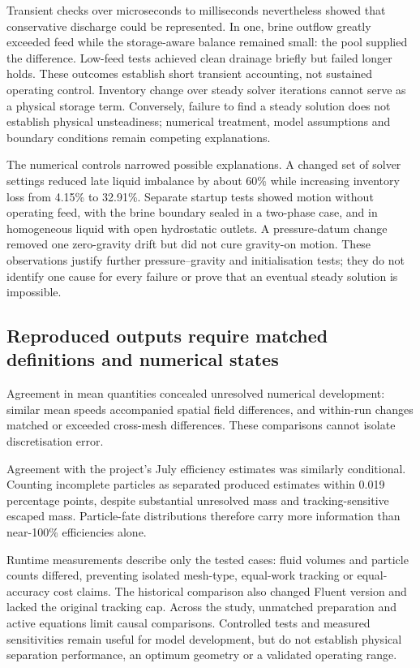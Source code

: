 Transient checks over microseconds to milliseconds nevertheless showed that conservative discharge could be represented. In one, brine outflow greatly exceeded feed while the storage-aware balance remained small: the pool supplied the difference. Low-feed tests achieved clean drainage briefly but failed longer holds. These outcomes establish short transient accounting, not sustained operating control. Inventory change over steady solver iterations cannot serve as a physical storage term. Conversely, failure to find a steady solution does not establish physical unsteadiness; numerical treatment, model assumptions and boundary conditions remain competing explanations.

The numerical controls narrowed possible explanations. A changed set of solver settings reduced late liquid imbalance by about 60\% while increasing inventory loss from 4.15\% to 32.91\%. Separate startup tests showed motion without operating feed, with the brine boundary sealed in a two-phase case, and in homogeneous liquid with open hydrostatic outlets. A pressure-datum change removed one zero-gravity drift but did not cure gravity-on motion. These observations justify further pressure--gravity and initialisation tests; they do not identify one cause for every failure or prove that an eventual steady solution is impossible.

\subsection{Reproduced outputs require matched definitions and numerical states}

Agreement in mean quantities concealed unresolved numerical development: similar mean speeds accompanied spatial field differences, and within-run changes matched or exceeded cross-mesh differences. These comparisons cannot isolate discretisation error.

Agreement with the project's July efficiency estimates was similarly conditional. Counting incomplete particles as separated produced estimates within 0.019 percentage points, despite substantial unresolved mass and tracking-sensitive escaped mass. Particle-fate distributions therefore carry more information than near-100\% efficiencies alone.

Runtime measurements describe only the tested cases: fluid volumes and particle counts differed, preventing isolated mesh-type, equal-work tracking or equal-accuracy cost claims. The historical comparison also changed Fluent version and lacked the original tracking cap. Across the study, unmatched preparation and active equations limit causal comparisons. Controlled tests and measured sensitivities remain useful for model development, but do not establish physical separation performance, an optimum geometry or a validated operating range.
